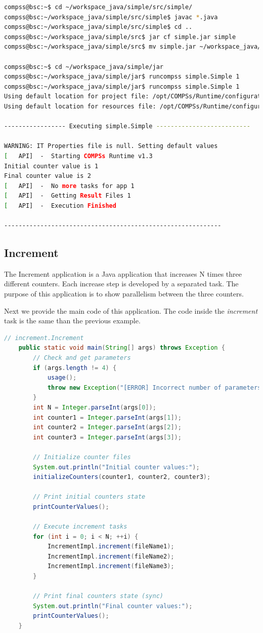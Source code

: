 \begin{lstlisting}[language=bash]
compss@bsc:~$ cd ~/workspace_java/simple/src/simple/
compss@bsc:~/workspace_java/simple/src/simple$ javac *.java
compss@bsc:~/workspace_java/simple/src/simple$ cd ..
compss@bsc:~/workspace_java/simple/src$ jar cf simple.jar simple
compss@bsc:~/workspace_java/simple/src$ mv simple.jar ~/workspace_java/simple/jar/

compss@bsc:~$ cd ~/workspace_java/simple/jar
compss@bsc:~/workspace_java/simple/jar$ runcompss simple.Simple 1
compss@bsc:~/workspace_java/simple/jar$ runcompss simple.Simple 1
Using default location for project file: /opt/COMPSs/Runtime/configuration/xml/projects/project.xml
Using default location for resources file: /opt/COMPSs/Runtime/configuration/xml/resources/resources.xml

----------------- Executing simple.Simple --------------------------

WARNING: IT Properties file is null. Setting default values
[   API]  -  Starting COMPSs Runtime v1.3
Initial counter value is 1
Final counter value is 2
[   API]  -  No more tasks for app 1
[   API]  -  Getting Result Files 1
[   API]  -  Execution Finished

------------------------------------------------------------
\end{lstlisting}


\subsection{Increment}
The Increment application is a Java application that increases N times three different counters. Each increase step is developed by a separated task. The
purpose of this application is to show parallelism between the three counters.

Next we provide the main code of this application. The code inside the \textit{increment} task is the same than the previous example. 

\begin{lstlisting}[language=java]
	// increment.Increment
	public static void main(String[] args) throws Exception {
		// Check and get parameters
		if (args.length != 4) {
			usage();
			throw new Exception("[ERROR] Incorrect number of parameters");
		}
		int N = Integer.parseInt(args[0]);
		int counter1 = Integer.parseInt(args[1]);
		int counter2 = Integer.parseInt(args[2]);
		int counter3 = Integer.parseInt(args[3]);
		
		// Initialize counter files
		System.out.println("Initial counter values:");
		initializeCounters(counter1, counter2, counter3);
		
		// Print initial counters state
		printCounterValues();

		// Execute increment tasks
		for (int i = 0; i < N; ++i) {
			IncrementImpl.increment(fileName1);
			IncrementImpl.increment(fileName2);
			IncrementImpl.increment(fileName3);
		}

		// Print final counters state (sync)
		System.out.println("Final counter values:");
		printCounterValues();
	}
\end{lstlisting}

